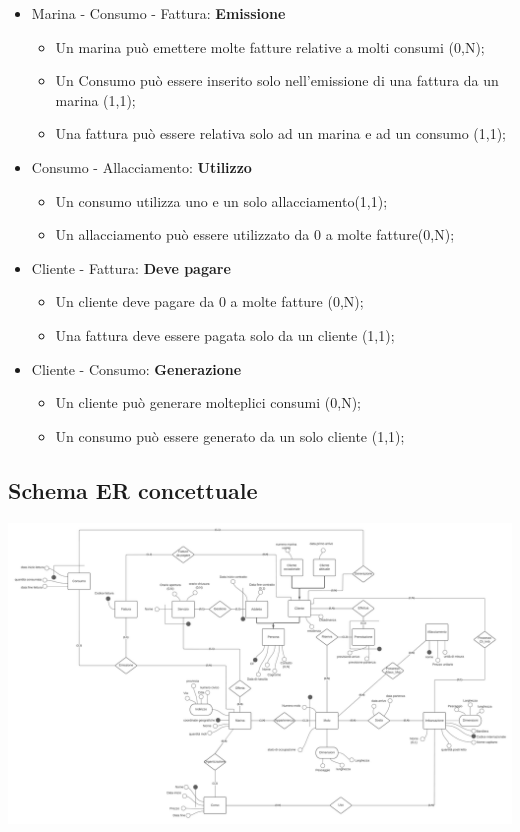 \begin{itemize}
    \item Marina - Consumo - Fattura: \textbf{Emissione}
    \begin{itemize}
        \item Un marina può emettere molte fatture relative a molti consumi (0,N);
        \item Un Consumo può essere inserito solo nell'emissione di una fattura da un marina (1,1);
        \item Una fattura può essere relativa solo ad un marina e ad un consumo (1,1);
    \end{itemize}
    
    \item Consumo - Allacciamento: \textbf{Utilizzo}
    \begin{itemize}
        \item Un consumo utilizza uno e un solo allacciamento(1,1);
        \item Un allacciamento può essere utilizzato da 0 a molte fatture(0,N);
    \end{itemize}
    
    \item Cliente - Fattura: \textbf{Deve pagare}
    \begin{itemize}
        \item Un cliente deve pagare da 0 a molte fatture (0,N);
        \item Una fattura deve essere pagata solo da un cliente (1,1);
    \end{itemize}
    
    \item Cliente - Consumo: \textbf{Generazione}
    \begin{itemize}
        \item Un cliente può generare molteplici consumi (0,N);
        \item Un consumo può essere generato da un solo cliente (1,1);
    \end{itemize}
    
\end{itemize}

\subsection{Schema ER concettuale}
\includegraphics[width=\textwidth]{img/erconcettuale.png}